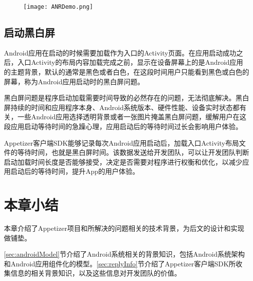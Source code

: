 \begin{figure}[!htp]
	\centering
	\texttt{[image: ANRDemo.png]}
\end{figure}

\subsection{启动黑白屏}

Android应用在启动的时候需要加载作为入口的Activity页面。在应用启动成功之后，入口Activity的布局内容加载完成之前，显示在设备屏幕上的是Android应用的主题背景，默认的通常是黑色或者白色，在这段时间用户只能看到黑色或白色的屏幕，称为Android应用启动时的黑白屏问题。

黑白屏问题是程序启动加载需要时间导致的必然存在的问题，无法彻底解决。黑白屏持续的时间和应用程序本身、Android系统版本、硬件性能、设备实时状态都有关，一些Android应用选择透明背景或者一张图片掩盖黑白屏问题，缓解用户在这段应用启动等待时间的急躁心理，应用启动后的等待时间过长会影响用户体验。

Appetizer客户端SDK能够记录每次Android应用启动后，加载入口Activity布局文件的等待时间，也就是黑白屏时间。该数据发送给开发团队，可以让开发团队判断启动加载时间长度是否能够接受，决定是否需要对程序进行权衡和优化，以减少应用启动后的等待时间，提升App的用户体验。

\section{本章小结}

本章介绍了Appetizer项目和所解决的问题相关的技术背景，为后文的设计和实现做铺垫。

\ref{sec:androidModel}节介绍了Android系统相关的背景知识，包括Android系统架构和Android应用组件化的模型。\ref{sec:replyInfo}节介绍了Appetizer客户端SDK所收集信息的相关背景知识，以及这些信息对开发团队的价值。
